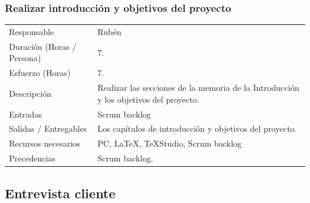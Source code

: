 \subsubsection{Realizar introducci\'{o}n y objetivos del proyecto}
\begin{table}[H]
    \begin{center}
        \begin{tabular}{l p{8cm}}
            Responsable                           & Rub\'{e}n \\
            Duraci\'{o}n (Horas / Persona)        & 7. \\ 
            Esfuerzo (Horas)                      & 7. \\
            Descripci\'{o}n                       & Realizar las secciones de la memoria de la Introducci\'{o}n y los
                                                    objetivos del proyecto. \\
            Entradas                              & Scrum backlog  \\
            Salidas / Entregables                 & Los cap\'{i}tulos de introducci\'{o}n y objetivos del proyecto. \\
            Recursos necesarios                   & PC, \LaTeX, TeXStudio, Scrum backlog \\
            Precedencias                          & Scrum backlog. \\
        \end{tabular}
    \end{center}
    
\end{table}

\subsection{Entrevista cliente}

